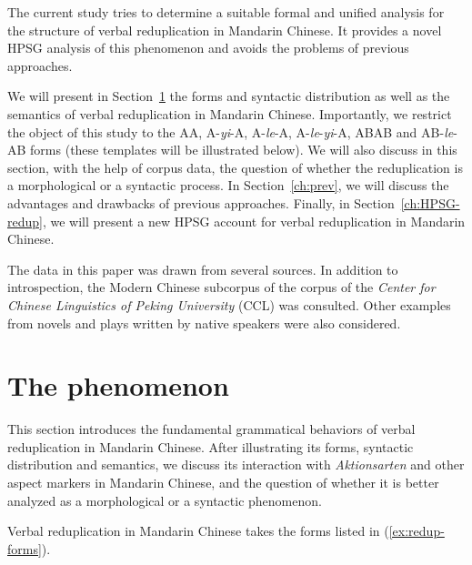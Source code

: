 \documentclass[11pt,a4paper,fleqn,draft]{article}
\begin{document}
The current study tries to determine a suitable formal and unified analysis for the structure of verbal reduplication in Mandarin Chinese.
It provides a novel HPSG analysis of this phenomenon and avoids the problems of previous approaches.

We will present in Section~\ref{ch:phen} the forms and syntactic distribution as well as the semantics of verbal reduplication in Mandarin Chinese. 
Importantly, we restrict the object of this study to the AA, A-\emph{yi}-A, A-\emph{le}-A, A-\emph{le}-\emph{yi}-A, ABAB and AB-\emph{le}-AB forms (these templates will be illustrated below).
We will also discuss in this section, with the help of corpus data, the question of whether the reduplication is a morphological or a syntactic process.
In Section~\ref{ch:prev}, we will discuss the advantages and drawbacks of previous approaches. 
Finally, in Section~\ref{ch:HPSG-redup}, we will present a new HPSG account for verbal reduplication in Mandarin Chinese.

The data in this paper was drawn from several sources.
In addition to introspection, the Modern Chinese subcorpus of the corpus of the \emph{Center for Chinese Linguistics of Peking University} (CCL) \citep{Zhanetal2003, Zhanetal2019} was consulted. 
Other examples from novels and plays written by native speakers were also considered.


\section{The phenomenon}\label{ch:phen}


This section introduces the fundamental grammatical behaviors of verbal reduplication in Mandarin Chinese. 
After illustrating its forms, syntactic distribution and semantics, 
we discuss its interaction with \emph{Aktionsarten} and other aspect markers in Mandarin Chinese, 
and the question of whether it is better analyzed as a morphological or a syntactic phenomenon.



Verbal reduplication in Mandarin Chinese takes the forms listed  in (\ref{ex:redup-forms}).
\end{document}
